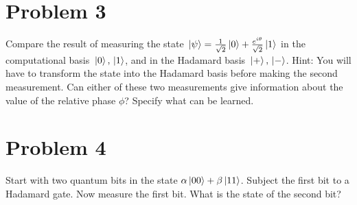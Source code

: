 \documentclass[10pt]{article}
\begin{document}
	\section*{Problem 3}
	Compare the result of measuring the state \( \ket*{\psi} = \frac{1}{\sqrt{2} }\ket*{0} +
	\frac{e^{i \theta}}{\sqrt{2} }\ket*{1} \) in the computational basis \( \ket*{0}, \ket*{1} \), 
	and in the Hadamard basis \( \ket*{+}, \ket*{-} \). Hint: You will have to transform the state into the Hadamard
	basis before making the second measurement. Can either of these two measurements give information about the value of
	the relative phase \( \phi \)? Specify what can be learned. 
	\pagebreak
	\section*{Problem 4}
	Start with two quantum bits in the state \( \alpha\ket*{00} + \beta\ket*{11} \). Subject the first bit to 
	a Hadamard gate. Now measure the first bit. What is the state of the second bit?
\end{document}

